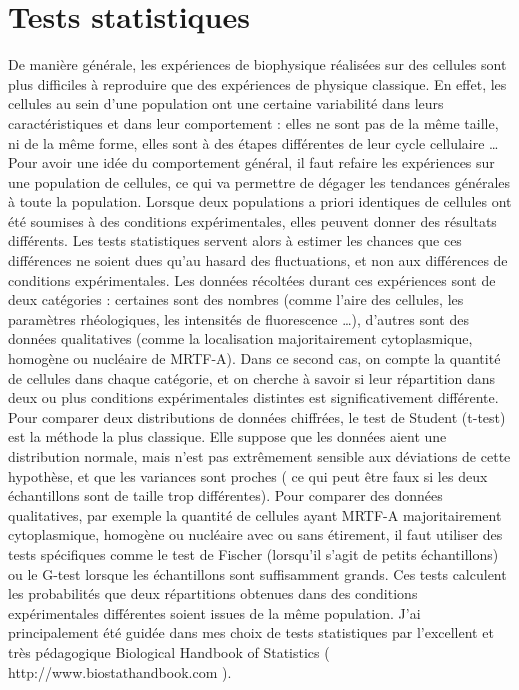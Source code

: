 \section{Tests statistiques}
	De manière générale, les expériences de biophysique réalisées sur des cellules sont plus difficiles à reproduire que des expériences de physique classique. 
	En effet, les cellules au sein d'une population ont une certaine variabilité dans leurs caractéristiques et dans leur comportement : elles ne sont pas de la même taille, ni de la même forme, elles sont à des étapes différentes de leur cycle cellulaire \dots 
	Pour avoir une idée du comportement général, il faut refaire les expériences sur une population de cellules, ce qui va permettre de dégager les tendances générales à toute la population. 
	Lorsque deux populations a priori identiques de cellules ont été soumises à des conditions expérimentales, elles peuvent donner des résultats différents. Les tests statistiques servent alors à estimer les chances que ces différences ne soient dues qu'au hasard des fluctuations, et non aux différences de conditions expérimentales. 	
	Les données récoltées durant ces expériences sont de deux catégories : certaines sont des nombres (comme l'aire des cellules, les paramètres rhéologiques, les intensités de fluorescence \dots), d'autres sont des données qualitatives (comme la localisation majoritairement cytoplasmique, homogène ou nucléaire de MRTF-A). Dans ce second cas, on compte la quantité de cellules dans chaque catégorie, et on cherche à savoir si leur répartition dans deux ou plus conditions expérimentales distintes est significativement différente.  
	Pour comparer deux distributions de données chiffrées, le test de Student (t-test) est la méthode la plus classique. Elle suppose que les données aient une distribution normale, mais n'est pas extrêmement sensible aux déviations de cette hypothèse, et que les variances sont proches ( ce qui peut être faux si les deux échantillons sont de taille trop différentes). 
	Pour comparer des données qualitatives, par exemple la quantité de cellules ayant MRTF-A majoritairement cytoplasmique, homogène ou nucléaire avec ou sans étirement, il faut utiliser des tests spécifiques comme le test de Fischer (lorsqu'il s'agit de petits échantillons) ou le G-test lorsque les échantillons sont suffisamment grands. Ces tests calculent les probabilités que deux répartitions obtenues dans des conditions expérimentales différentes soient issues de la même population. 
	J'ai principalement été guidée dans mes choix de tests statistiques par l'excellent et très pédagogique Biological Handbook of Statistics ( http://www.biostathandbook.com ).
	
%
